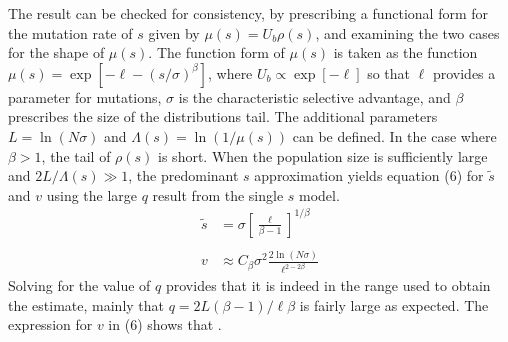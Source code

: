 \documentclass[12pt, two column]{article}
\begin{document}
The result can be checked for consistency, by prescribing a functional form for the mutation rate of $s$ given by $\mu(s)=U_b \rho(s)$, and examining the two cases for the shape of $\mu(s)$.  The function form of $\mu(s)$ is taken as the function $\mu(s) = \exp[-\ell - (s/\sigma)^\beta]$, where $U_b \propto \exp[-\ell]$ so that $\ell$ provides a parameter for mutations, $\sigma$ is the characteristic selective advantage, and $\beta $ prescribes the size of the distributions tail.  The additional parameters $L=\ln(N\sigma)$ and $\Lambda(s)= \ln(1/\mu(s))$ can be defined.  In the case where $\beta > 1$, the tail of $\rho(s)$ is short.  When the population size is sufficiently large and $2L/\Lambda(s)\gg 1$, the predominant $s$ approximation yields equation (6) for $\tilde{s}$ and $v$ using the large $q$ result from the single $s$ model.
\begin{equation}
\begin{aligned}
\tilde{s} &= \sigma\left[ \frac{\ell}{\beta-1} \right]^{1/\beta}\\
\\
v & \approx C_\beta \sigma^2 \frac{2 \ln(N\sigma)}{\ell^{2-2\beta}}
\end{aligned}
\end{equation}
Solving for the value of $q$ provides that it is indeed in the range used to obtain the estimate, mainly that $q=2L(\beta-1)/\ell \beta$ is fairly large as expected.  The expression for $v$ in (6) shows that  .  
\end{document}
